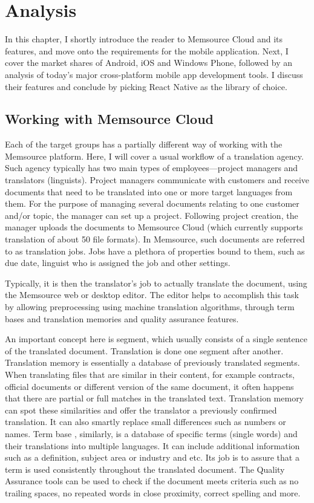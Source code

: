 \chapter{Analysis}

In this chapter, I shortly introduce the reader to Memsource Cloud and its features, and move onto the requirements for the mobile application. Next, I cover the market shares of Android, iOS and Windows Phone, followed by an analysis of today's major cross-platform mobile app development tools. I discuss their features and conclude by picking React Native as the library of choice. 

\section{Working with Memsource Cloud}

Each of the target groups has a partially different way of working with the Memsource platform. Here, I will cover a usual workflow of a translation agency. Such agency typically has two main types of employees---project managers and translators (linguists). Project managers communicate with customers and receive documents that need to be translated into one or more target languages from them. For the purpose of managing several documents relating to one customer and/or topic, the manager can set up a project. Following project creation, the manager uploads the documents to Memsource Cloud (which currently supports translation of about 50 file formats). In Memsource, such documents are referred to as translation jobs. Jobs have a plethora of properties bound to them, such as due date, linguist who is assigned the job and other settings.

Typically, it is then the translator's job to actually translate the document, using the Memsource web or desktop editor. The editor helps to accomplish this task by allowing preprocessing using machine translation algorithms, through term bases and translation memories and quality assurance features. 

An important concept here is segment, which usually consists of a single sentence of the translated document. Translation is done one segment after another. Translation memory  is essentially a database of previously translated segments. When translating files that are similar in their content, for example contracts, official documents or different version of the same document, it often happens that there are partial or full matches in the translated text. Translation memory can spot these similarities and offer the translator a previously confirmed translation. It can also smartly replace small differences such as numbers or names. Term base , similarly, is a database of specific terms (single words) and their translations into multiple languages. It can include additional information such as a definition, subject area or industry and etc. Its job is to assure that a term is used consistently throughout the translated document. The Quality Assurance tools can be used to check if the document meets criteria such as no trailing spaces, no repeated words in close proximity, correct spelling and more.

